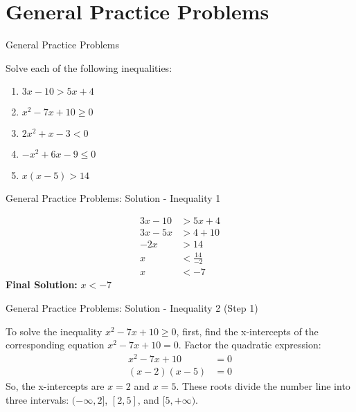 \documentclass[aspectratio=169]{beamer}
\begin{document}
\section{General Practice Problems}

\begin{frame}{General Practice Problems}
    \begin{tcolorbox}[colback=lightgray,colframe=primary,title=Solve Each Inequality]
        \footnotesize
        Solve each of the following inequalities:
        \begin{enumerate}
            \item $3x - 10 > 5x + 4$
            \item $x^2 - 7x + 10 \geq 0$
            \item $2x^2 + x - 3 < 0$
            \item $-x^2 + 6x - 9 \leq 0$
            \item $x(x-5) > 14$
        \end{enumerate}
    \end{tcolorbox}
\end{frame}

\begin{frame}{General Practice Problems: Solution - Inequality 1}
    \begin{tcolorbox}[colback=lightgray,colframe=accent,title=Solution: $3x - 10 > 5x + 4$]
        \footnotesize
        \begin{align*}
            3x - 10 &> 5x + 4 \\
            3x - 5x &> 4 + 10 \\
            -2x &> 14 \\
            x &< \frac{14}{-2} \\
            x &< -7
        \end{align*}
        \newline
        \textbf{Final Solution:} $x < -7$
    \end{tcolorbox}
\end{frame}

\begin{frame}{General Practice Problems: Solution - Inequality 2 (Step 1)}
    \begin{tcolorbox}[colback=lightgray,colframe=accent,title=Solution: $x^2 - 7x + 10 \geq 0$ (Step 1 - Find X-intercepts)]
        \footnotesize
        To solve the inequality $x^2 - 7x + 10 \geq 0$, first, find the x-intercepts of the corresponding equation $x^2 - 7x + 10 = 0$.
        Factor the quadratic expression:
        \begin{align*}
            x^2 - 7x + 10 &= 0 \\
            (x-2)(x-5) &= 0
        \end{align*}
        So, the x-intercepts are $x=2$ and $x=5$.
        These roots divide the number line into three intervals: $(-\infty, 2]$, $[2, 5]$, and $[5, +\infty)$.
    \end{tcolorbox}
\end{frame}
\end{document}

